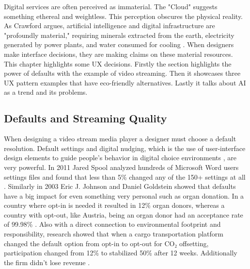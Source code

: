Digital services are often perceived as immaterial. The "Cloud" suggests something ethereal and weightless. This perception obscures the physical reality. As Crawford argues, artificial intelligence and digital infrastructure are "profoundly material," requiring minerals extracted from the earth, electricity generated by power plants, and water consumed for cooling \cite{Crawford2021Atlas}. When designers make interface decisions, they are making claims on these material resources. This chapter highlights some UX decisions. Firstly the section highlights the power of defaults with the example of video streaming. Then it showcases three UX pattern examples that have eco-friendly alternatives. Lastly it talks about AI as a trend and its problems.

\subsection{Defaults and Streaming Quality}

When designing a video stream media player a designer must choose a default resolution. Default settings and digital nudging, which is the use of user-interface design elements
to guide people’s behavior in digital choice environments \cite{nudge},
 are very powerful. In 2011 Jared Spool analyzed hundreds of Microsoft Word users settings files and found that less than 5\% changed any of the 150+ settings at all \cite{Spool2011Settings}. Similarly in 2003 Eric J. Johnson and Daniel Goldstein showed that defaults have a big impact for even something very personal such as organ donation. In a country where opt-in is needed it resulted in 12\% organ donors, whereas a country with opt-out, like Austria, being an organ donor had an acceptance rate of 99.98\% \cite{Organs}. Also with a direct connection to environmental footprint and responsibility, research showed that when a cargo transportation platform changed the default option from opt-in to opt-out for CO₂ offsetting, participation changed from 12\% to stabilized 50\% after 12 weeks. Additionally the firm didn’t lose revenue \cite{Transports}.

